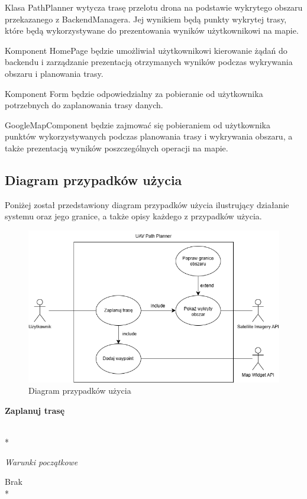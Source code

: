Klasa PathPlanner wytycza trasę przelotu drona na podstawie wykrytego obszaru przekazanego z BackendManagera. Jej wynikiem będą punkty wykrytej trasy, które będą wykorzystywane do prezentowania wyników użytkownikowi na mapie.

Komponent HomePage będzie umożliwiał użytkownikowi kierowanie żądań do backendu i zarządzanie prezentacją otrzymanych wyników podczas wykrywania obszaru i planowania trasy.

Komponent Form będzie odpowiedzialny za pobieranie od użytkownika potrzebnych do zaplanowania trasy danych.

GoogleMapComponent będzie zajmować się pobieraniem od użytkownika punktów wykorzystywanych podczas planowania trasy i wykrywania obszaru, a także prezentacją wyników poszczególnych operacji na mapie.

\subsection{Diagram przypadków użycia}

Poniżej został przedstawiony diagram przypadków użycia ilustrujący działanie systemu oraz jego granice, a także opisy każdego z przypadków użycia.

\begin{figure}[H]
    \centering
    \includegraphics[width=15cm]{images/Diagram_przypadków_użycia.png}
    \caption{Diagram przypadków użycia}
\end{figure}

\hypertarget{plan route}{\textbf{Zaplanuj trasę}} \\*

\textit{Warunki początkowe}

Brak \\*

